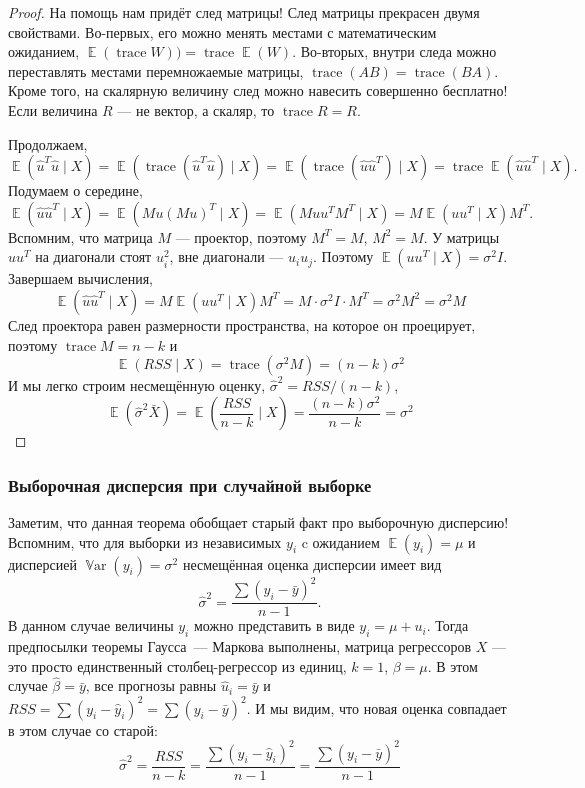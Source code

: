 \documentclass[12pt]{article}
\DeclareMathOperator{\Var}{\mathbb{V}ar}
\DeclareMathOperator{\E}{\mathbb{E}}
\DeclareMathOperator{\trace}{trace}
\newcommand{\hb}{\hat{\beta}}
\newcommand{\hu}{\hat{u}}
\newcommand{\hs}{\hat{\sigma}}
\newcommand{\hy}{\hat{y}}
\newcommand{\RSS}{RSS}
\begin{document}
\begin{proof}
На помощь нам придёт след матрицы! 
След матрицы прекрасен двумя свойствами. 
Во-первых, его можно менять местами с математическим ожиданием, $\E(\trace W)) = \trace \E(W)$. 
Во-вторых, внутри следа можно переставлять местами перемножаемые матрицы, $\trace (AB) = \trace (BA)$. 
Кроме того, на скалярную величину след можно навесить совершенно бесплатно!
Если величина $R$ — не вектор, а скаляр, то $\trace R = R$.

Продолжаем,
\[
\E(\hu^T \hu \mid X) = \E(\trace (\hu^T \hu) \mid X) = \E( \trace(\hu \hu^T)\mid X) = \trace \E(\hu \hu^T \mid X).
\]
Подумаем о середине,
\[
\E(\hu \hu^T \mid X) = \E(Mu (Mu)^T \mid X) = \E(Mu u^T M^T \mid X) = M \E(uu^T \mid X) M^T.
\]
Вспомним, что матрица $M$ — проектор, поэтому $M^T = M$, $M^2 = M$.
У матрицы $uu^T$ на диагонали стоят $u_i^2$, вне диагонали — $u_iu_j$.
Поэтому $\E(uu^T\mid X) = \sigma^2 I$.
Завершаем вычисления,
\[
\E(\hu \hu^T \mid X) =  M \E(uu^T \mid X) M^T= M \cdot \sigma^2 I \cdot M^T = \sigma^2 M^2 = \sigma^2 M
\]
След проектора равен размерности пространства, на которое он проецирует, поэтому $\trace M = n - k$ и
\[
\E(RSS \mid X) = \trace(\sigma^2 M) = (n - k) \sigma^2
\]
И мы легко строим несмещённую оценку, $\hs^2 = \RSS / (n - k)$,
\[
\E( \hs^2 \bar X) = \E \left( \frac{\RSS}{n - k} \mid X \right) = \frac{(n - k) \sigma^2}{ n - k} = \sigma^2
\]

\end{proof}

\subsubsection*{Выборочная дисперсия при случайной выборке}

Заметим, что данная теорема обобщает старый факт про выборочную дисперсию!
Вспомним, что для выборки из независимых $y_i$ c ожиданием $\E(y_i) = \mu$ и дисперсией $\Var(y_i) = \sigma^2$ несмещённая оценка дисперсии имеет вид 
\[
\hat\sigma^2 = \frac{\sum(y_i - \bar y)^2}{n - 1}.
\]
В данном случае величины $y_i$ можно представить в виде $y_i = \mu + u_i$.
Тогда предпосылки теоремы Гаусса~— Маркова выполнены, матрица регрессоров $X$  — это просто единственный столбец-регрессор из единиц, $k = 1$, $\beta = \mu$. 
В этом случае $\hb = \bar y$, все прогнозы равны $\hu_i = \bar y$ и $\RSS = \sum (y_i - \hy_i)^2 = \sum (y_i - \bar y)^2$.
И мы видим, что новая оценка совпадает в этом случае со старой:
\[
\hat\sigma^2 = \frac{\RSS}{n- k} = \frac{\sum (y_i - \hy_i)^2}{ n - 1} = \frac{\sum (y_i - \bar y)^2}{n - 1}
\]
\end{document}
